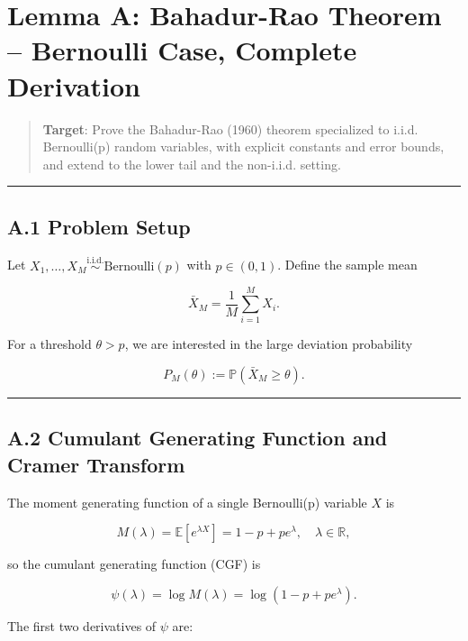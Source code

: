 \documentclass[
  12pt,
]{article}
\author{SCX}
\date{2026}
\begin{document}
\section{Lemma A: Bahadur-Rao Theorem -- Bernoulli Case, Complete
Derivation}\label{lemma-a-bahadur-rao-theorem-bernoulli-case-complete-derivation}

\begin{quote}
\textbf{Target}: Prove the Bahadur-Rao (1960) theorem specialized to
i.i.d. Bernoulli(p) random variables, with explicit constants and error
bounds, and extend to the lower tail and the non-i.i.d. setting.
\end{quote}

\begin{center}\rule{0.5\linewidth}{0.5pt}\end{center}

\subsection{A.1 Problem Setup}\label{a.1-problem-setup}

Let
\(X_1, \ldots, X_M \stackrel{\text{i.i.d.}}{\sim} \text{Bernoulli}(p)\)
with \(p \in (0,1)\). Define the sample mean

\[\bar{X}_M = \frac{1}{M}\sum_{i=1}^M X_i.\]

For a threshold \(\theta > p\), we are interested in the large deviation
probability

\[P_M(\theta) := \mathbb{P}(\bar{X}_M \geq \theta).\]

\begin{center}\rule{0.5\linewidth}{0.5pt}\end{center}

\subsection{A.2 Cumulant Generating Function and Cramer
Transform}\label{a.2-cumulant-generating-function-and-cramer-transform}

The moment generating function of a single Bernoulli(p) variable \(X\)
is

\[M(\lambda) = \mathbb{E}[e^{\lambda X}] = 1-p + p e^\lambda, \quad \lambda \in \mathbb{R},\]

so the cumulant generating function (CGF) is

\[\psi(\lambda) = \log M(\lambda) = \log(1-p + p e^\lambda).\]

The first two derivatives of \(\psi\) are:
\end{document}
